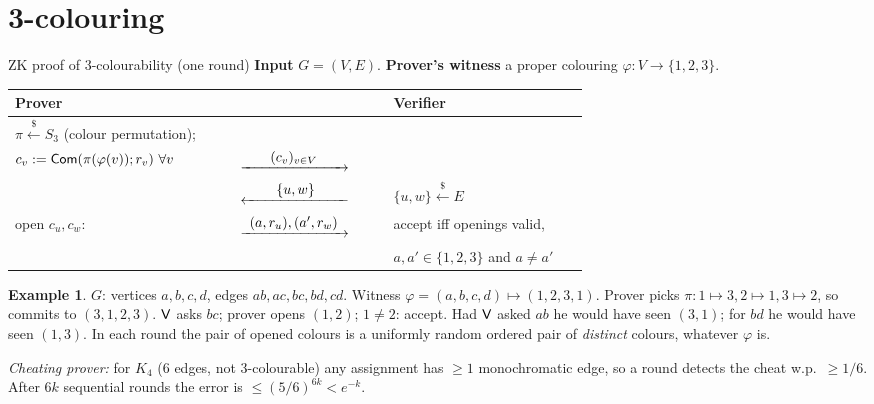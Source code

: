 \documentclass[11pt,a4paper]{report}
\makeatletter
\theoremstyle{plain}
\theoremstyle{definition}
\newtheorem{example}[theorem]{Example}
\theoremstyle{remark}
\newcommand{\getsr}{\xleftarrow{\$}}
\newcommand{\ra}[1]{\xrightarrow{\makebox[2.5cm]{$#1$}}}
\newcommand{\la}[1]{\xleftarrow{\makebox[2.5cm]{$#1$}}}
\newenvironment{flow}[2]{%
  \par\smallskip\noindent
  \begin{tabular}{@{}L{0.34\linewidth} c L{0.34\linewidth}@{}}
  \textbf{#1} & & \textbf{#2}\\ \hline}{\end{tabular}\par\smallskip}
\makeatother
\begin{document}
\section{3-colouring}
\begin{protocol}[label=pr:col3]{ZK proof of 3-colourability (one round)}
\textbf{Input} $G=(V,E)$. \textbf{Prover's witness} a proper colouring $\varphi:V\to\{1,2,3\}$.
\begin{flow}{Prover}{Verifier}
$\pi\getsr S_3$ (colour permutation); & & \\
$c_v:=\mathsf{Com}(\pi(\varphi(v));r_v)\ \forall v$ & $\ra{(c_v)_{v\in V}}$ & \\
 & $\la{\{u,w\}}$ & $\{u,w\}\getsr E$\\
open $c_u,c_w$: & $\ra{(a,r_u),(a',r_w)}$ & accept iff openings valid, \\
 & & $a,a'\in\{1,2,3\}$ and $a\ne a'$
\end{flow}
\end{protocol}
\begin{center}
\end{center}
\begin{example}\label{ex:3col}
$G$: vertices $a,b,c,d$, edges $ab,ac,bc,bd,cd$. Witness $\varphi=(a,b,c,d)\mapsto(1,2,3,1)$. Prover picks $\pi:1\mapsto3,2\mapsto1,3\mapsto2$, so commits to $(3,1,2,3)$. $\mathsf{V}$ asks $bc$; prover opens $(1,2)$; $1\neq2$: accept. Had $\mathsf{V}$ asked $ab$ he would have seen $(3,1)$; for $bd$ he would have seen $(1,3)$. In each round the pair of opened colours is a uniformly random ordered pair of \emph{distinct} colours, whatever $\varphi$ is. 

\emph{Cheating prover:} for $K_4$ (6 edges, not 3-colourable) any assignment has $\ge1$ monochromatic edge, so a round detects the cheat w.p.\ $\ge1/6$. After $6k$ sequential rounds the error is $\le(5/6)^{6k}<e^{-k}$.
\end{example}
\end{document}
